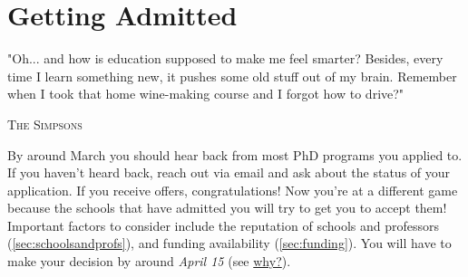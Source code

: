 \documentclass[oneside,11pt]{memoir}
\begin{document}








%


\chapter{Getting Admitted}\label{sec:accepted}

\epigraph{"Oh... and how is education supposed to make me feel smarter? Besides, every time I learn something new, it pushes some old stuff out of my brain. Remember when I took that home wine-making course and I forgot how to drive?"}{\textsc{The Simpsons}}

By around March you should hear back from most PhD programs you applied to. If you haven't heard back, reach out via email and ask about the status of your application.
If you receive offers, congratulations!  Now you're at a different game because the schools that have admitted you will try to get you to accept them!  Important factors to consider include the reputation of schools and professors (\autoref{sec:schoolsandprofs}), and funding availability (\autoref{sec:funding}). You will have to make your decision by around \emph{April 15} (see \href{https://cgsnet.org/wp-content/uploads/2024/01/CGS_April15_Resolution_Jan312024.pdf}{why?}).
\end{document}
